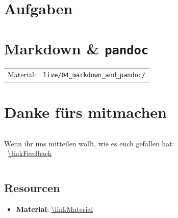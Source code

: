 \documentclass[14pt,aspectratio=169]{beamer}
\begin{document}



\section*{Aufgaben}
\sectionframe





\section{\faMarkdown Markdown \& \texttt{pandoc}}
\begin{frame}
    \sectionpage
    \vspace{.5em}
    \begin{tabular}{ll}
        Material:  & \texttt{live/04_markdown_and_pandoc/}
    \end{tabular}    
\end{frame}




\section*{Danke fürs mitmachen}
\begin{frame}
    \sectionpage
    \vspace{1em}
    \begin{columns}[c]
        Wenn ihr uns mitteilen wollt, wie es euch gefallen hat:\\
        \faComment*[regular]\ \url{\linkFeedback}
        \centering
        \qrcode[height=.6\textwidth]{\linkFeedback}
    \end{columns}
\end{frame}


\subsection*{Resourcen}
\begin{frame}{\insertsubsection}
    \begin{itemize}
        \item \textbf{Material}: \url{\linkMaterial}
    \end{itemize}
\end{frame}


\end{document}
